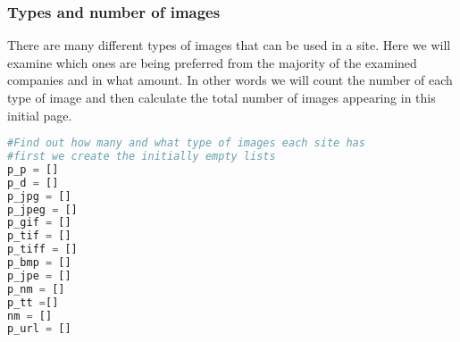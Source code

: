 \documentclass{article}
\begin{document}
\subsubsection{Types and number of images}
There are many different types of images that can be used in a site. Here we will examine which ones are being preferred from the majority of the examined companies and in what amount. In other words we will count the number of each type of image and then calculate the total number of images appearing in this initial page.
\begin{lstlisting}[language=Python]
#Find out how many and what type of images each site has
#first we create the initially empty lists
p_p = []
p_d = []
p_jpg = []
p_jpeg = []
p_gif = []
p_tif = []
p_tiff = []
p_bmp = []
p_jpe = []
p_nm = []
p_tt =[]
nm = []
p_url = []
 



\end{lstlisting}
\end{document}
